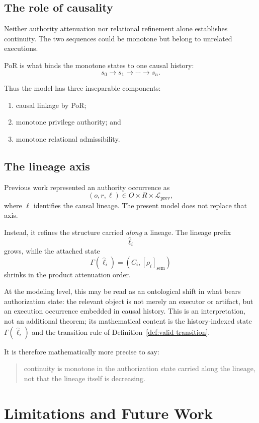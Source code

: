 \documentclass[10pt,twocolumn]{article}
\begin{document}
\subsection{The role of causality}

Neither authority attenuation nor relational refinement alone establishes
continuity. The two sequences could be monotone but belong to unrelated
executions.

PoR is what binds the monotone states to one causal history:
\[
s_0\rightarrow s_1\rightarrow\cdots\rightarrow s_n.
\]

Thus the model has three inseparable components:
\begin{enumerate}
    \item causal linkage by PoR;
    \item monotone privilege authority; and
    \item monotone relational admissibility.
\end{enumerate}

\subsection{The lineage axis}

Previous work represented an authority occurrence as
\[
(o,r,\ell)\in O\times R\times\mathcal L_{\mathrm{prev}},
\]
where \(\ell\) identifies the causal lineage. The present model does not replace
that axis.

Instead, it refines the structure carried \emph{along} a lineage. The lineage
prefix
\[
\widehat{\ell}_i
\]
grows, while the attached state
\[
\Gamma(\widehat{\ell}_i)=(C_i,[\rho_i]_{\mathrm{sem}})
\]
shrinks in the product attenuation order.

At the modeling level, this may be read as an ontological shift in what bears
authorization state: the relevant object is not merely an executor or artifact,
but an execution occurrence embedded in causal history. This is an
interpretation, not an additional theorem; its mathematical content is the
history-indexed state \(\Gamma(\widehat{\ell}_i)\) and the transition rule of
Definition~\ref{def:valid-transition}.

It is therefore mathematically more precise to say:
\begin{quote}
continuity is monotone in the authorization state carried along the lineage,
not that the lineage itself is decreasing.
\end{quote}

\section{Limitations and Future Work}
\label{sec:limitations}
\end{document}
